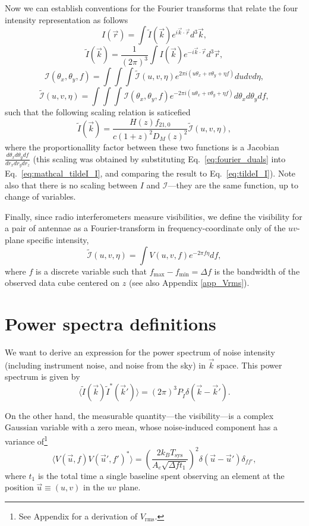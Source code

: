 \documentclass[12pt]{paper}
\newcommand{\beq}{\begin{equation}}
\newcommand{\eeq}{\end{equation}}
\begin{document}
Now we can establish conventions for the Fourier transforms that relate the four intensity representation as follows
\beq
I(\vec{r}) = \int\widetilde{I}(\vec{k})e^{i\vec{k} \cdot \vec{r}}d^3\vec{k},
\label{eq:I_tildeI}
\eeq
\beq
\widetilde{I}(\vec{k}) = \frac{1}{(2\pi)^3}\int{I}(\vec{k})e^{-i\vec{k} \cdot \vec{r}}d^3\vec{r},
\label{eq:tildeI_I}
\eeq
\beq
\mathcal{I}(\theta_x,\theta_y,f) = \int\int\int\widetilde{\mathcal{I}}(u,v,\eta)e^{2\pi i(u\theta_x + v\theta_y+\eta f)}dudvd\eta,
\label{eq:mathcal_I_tildeI}
\eeq
\beq
\widetilde{\mathcal{I}}(u,v,\eta) = \int\int\int{\mathcal{I}}(\theta_x,\theta_y,f)e^{-2\pi i(u\theta_x + v\theta_y+\eta f)}d\theta_xd\theta_ydf,
\label{eq:mathcal_tildeI_I}
\eeq
such that the following scaling relation is saticefied
\begin{equation}
\widetilde{I}(\vec{k}) = \frac{H(z)f_{21,0}}{c(1+z)^2D_M(z)^2}\widetilde{\mathcal{I}}(u,v,\eta),
\label{eq_tilde_I_vs_Ik_scaling}
\end{equation}
where the proportionallity factor between these two functions is a Jacobian $\frac{d\theta_xd\theta_ydf}{dr_xdr_ydr_z}$ (this scaling was obtained by substituting Eq.~\ref{eq:fourier_duals} into Eq.~\ref{eq:mathcal_tildeI_I}, and comparing the result to Eq.~\ref{eq:tildeI_I}). Note also that there is no scaling between $I$ and $\mathcal{I}$---they are the same function, up to change of variables.

Finally, since radio interferometers measure visibilities, we define the visibility for a pair of antennae as a Fourier-transform in frequency-coordinate only of the $uv$-plane specific intensity,
\beq
\mathcal{\widetilde{I}}(u,v,\eta) = \int V(u,v,f)e^{-2\pi f\eta}df,
\label{eq:visibility}
\eeq
where $f$ is a discrete variable such that $f_\text{max}-f_\text{min}=\Delta f$ is the bandwidth of the observed data cube centered on $z$ (see also Appendix \ref{app_Vrms}).
\section{Power spectra definitions}

We want to derive an expression for the power spectrum of noise intensity (including instrument noise, and noise from the sky) in $\vec{k}$ space. This power spectrum is given by
\beq
\langle \widetilde{I}(\vec{k})\widetilde{I}^*(\vec{k}')\rangle = (2\pi)^3P_{\widetilde{I}}\delta(\vec{k}-\vec{k}').
\label{eq_tildeI_power}
\eeq

On the other hand, the measurable quantity---the visibility---is a complex Gaussian variable with a zero mean, whose noise-induced component has a variance of\footnote{See Appendix for a derivation of $V_\text{rms}$.}
\beq
\langle V(\vec{u},f)V(\vec{u}',f')^*\rangle = \left(\frac{2k_BT_\text{sys}}{A_e\sqrt{\Delta f t_1}}\right)^2 \delta(\vec{u}-\vec{u}')\delta_{ff'},
\label{eq_Vrms}
\eeq 
where $t_1$ is the total time a single baseline spent observing an element at the position $\vec u \equiv(u,v)$ in the $uv$ plane. 
\end{document}
